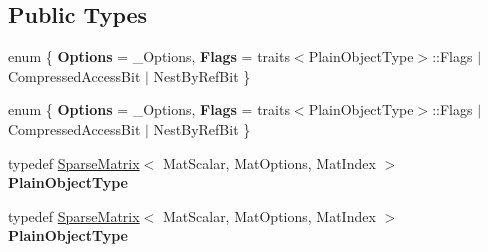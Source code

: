 \subsection*{Public Types}
\begin{DoxyCompactItemize}
\item 
\mbox{\label{struct_eigen_1_1internal_1_1traits_3_01_ref_3_01_sparse_matrix_3_01_mat_scalar_00_01_mat_optionsa860cad8c30d0eada972a685a49da86f_aa9b65c0fa553599cfc86d52d8ee00d12}} 
enum \{ {\bfseries Options} = \+\_\+\+Options, 
{\bfseries Flags} = traits$<$Plain\+Object\+Type$>$\+:\+:Flags $\vert$ Compressed\+Access\+Bit $\vert$ Nest\+By\+Ref\+Bit
 \}
\item 
\mbox{\label{struct_eigen_1_1internal_1_1traits_3_01_ref_3_01_sparse_matrix_3_01_mat_scalar_00_01_mat_optionsa860cad8c30d0eada972a685a49da86f_a7cb866a120afbc5736449e4b020b2f90}} 
enum \{ {\bfseries Options} = \+\_\+\+Options, 
{\bfseries Flags} = traits$<$Plain\+Object\+Type$>$\+:\+:Flags $\vert$ Compressed\+Access\+Bit $\vert$ Nest\+By\+Ref\+Bit
 \}
\item 
\mbox{\label{struct_eigen_1_1internal_1_1traits_3_01_ref_3_01_sparse_matrix_3_01_mat_scalar_00_01_mat_optionsa860cad8c30d0eada972a685a49da86f_a481a45a9d6b5a79e674f8c6f79edb3da}} 
typedef \hyperlink{group___sparse_core___module_class_eigen_1_1_sparse_matrix}{Sparse\+Matrix}$<$ Mat\+Scalar, Mat\+Options, Mat\+Index $>$ {\bfseries Plain\+Object\+Type}
\item 
\mbox{\label{struct_eigen_1_1internal_1_1traits_3_01_ref_3_01_sparse_matrix_3_01_mat_scalar_00_01_mat_optionsa860cad8c30d0eada972a685a49da86f_a481a45a9d6b5a79e674f8c6f79edb3da}} 
typedef \hyperlink{group___sparse_core___module_class_eigen_1_1_sparse_matrix}{Sparse\+Matrix}$<$ Mat\+Scalar, Mat\+Options, Mat\+Index $>$ {\bfseries Plain\+Object\+Type}
\end{DoxyCompactItemize}


